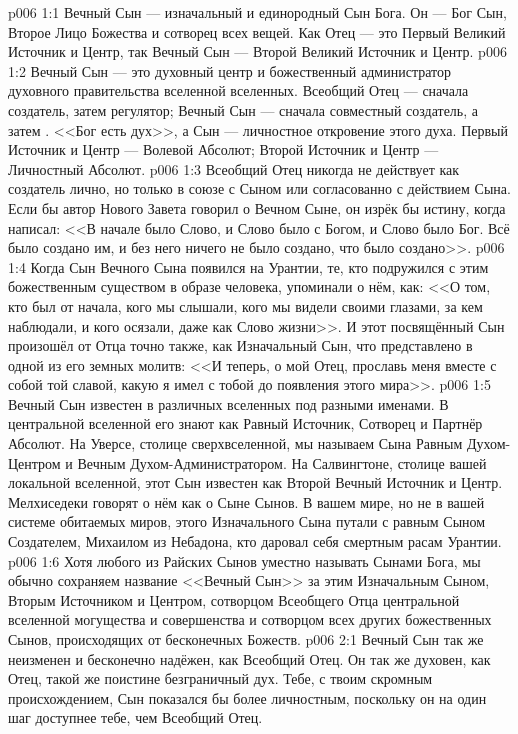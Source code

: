 \vs p006 1:1 Вечный Сын --- изначальный и единородный Сын Бога. Он --- Бог Сын, Второе Лицо Божества и сотворец всех вещей. Как Отец --- это Первый Великий Источник и Центр, так Вечный Сын --- Второй Великий Источник и Центр.
\vs p006 1:2 Вечный Сын --- это духовный центр и божественный администратор духовного правительства вселенной вселенных. Всеобщий Отец --- сначала создатель, затем регулятор; Вечный Сын --- сначала совместный создатель, а затем . <<Бог есть дух>>, а Сын --- личностное откровение этого духа. Первый Источник и Центр --- Волевой Абсолют; Второй Источник и Центр --- Личностный Абсолют.
\vs p006 1:3 Всеобщий Отец никогда не действует как создатель лично, но только в союзе с Сыном или согласованно с действием Сына. Если бы автор Нового Завета говорил о Вечном Сыне, он изрёк бы истину, когда написал: <<В начале было Слово, и Слово было с Богом, и Слово было Бог. Всё было создано им, и без него ничего не было создано, что было создано>>.
\vs p006 1:4 Когда Сын Вечного Сына появился на Урантии, те, кто подружился с этим божественным существом в образе человека, упоминали о нём, как: <<О том, кто был от начала, кого мы слышали, кого мы видели своими глазами, за кем наблюдали, и кого осязали, даже как Слово жизни>>. И этот посвящённый Сын произошёл от Отца точно также, как Изначальный Сын, что представлено в одной из его земных молитв: <<И теперь, о мой Отец, прославь меня вместе с собой той славой, какую я имел с тобой до появления этого мира>>.
\vs p006 1:5 \pc Вечный Сын известен в различных вселенных под разными именами. В центральной вселенной его знают как Равный Источник, Сотворец и Партнёр Абсолют. На Уверсе, столице сверхвселенной, мы называем Сына Равным Духом\hyp{}Центром и Вечным Духом\hyp{}Администратором. На Салвингтоне, столице вашей локальной вселенной, этот Сын известен как Второй Вечный Источник и Центр. Мелхиседеки говорят о нём как о Сыне Сынов. В вашем мире, но не в вашей системе обитаемых миров, этого Изначального Сына путали с равным Сыном Создателем, Михаилом из Небадона, кто даровал себя смертным расам Урантии.
\vs p006 1:6 Хотя любого из Райских Сынов уместно называть Сынами Бога, мы обычно сохраняем название <<Вечный Сын>> за этим Изначальным Сыном, Вторым Источником и Центром, сотворцом Всеобщего Отца центральной вселенной могущества и совершенства и сотворцом всех других божественных Сынов, происходящих от бесконечных Божеств.
\vs p006 2:1 Вечный Сын так же неизменен и бесконечно надёжен, как Всеобщий Отец. Он так же духовен, как Отец, такой же поистине безграничный дух. Тебе, с твоим скромным происхождением, Сын показался бы более личностным, поскольку он на один шаг доступнее тебе, чем Всеобщий Отец.
